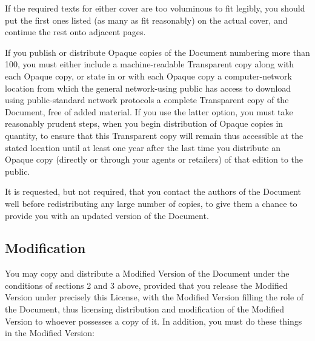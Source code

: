 \documentclass[letterpaper,twoside]{scrartcl}
\begin{document}
   If the required texts for either cover are too voluminous to fit
   legibly, you should put the first ones listed (as many as fit
   reasonably) on the actual cover, and continue the rest onto adjacent
   pages.

   If you publish or distribute Opaque copies of the Document numbering
   more than 100, you must either include a machine-readable Transparent
   copy along with each Opaque copy, or state in or with each Opaque copy
   a computer-network location from which the general network-using
   public has access to download using public-standard network protocols
   a complete Transparent copy of the Document, free of added material.
   If you use the latter option, you must take reasonably prudent steps,
   when you begin distribution of Opaque copies in quantity, to ensure
   that this Transparent copy will remain thus accessible at the stated
   location until at least one year after the last time you distribute an
   Opaque copy (directly or through your agents or retailers) of that
   edition to the public.

   It is requested, but not required, that you contact the authors of the
   Document well before redistributing any large number of copies, to give
   them a chance to provide you with an updated version of the Document.


   
   
   \subsection{Modification}
   

   You may copy and distribute a Modified Version of the Document under
   the conditions of sections 2 and 3 above, provided that you release
   the Modified Version under precisely this License, with the Modified
   Version filling the role of the Document, thus licensing distribution
   and modification of the Modified Version to whoever possesses a copy
   of it.  In addition, you must do these things in the Modified Version:
\end{document}
